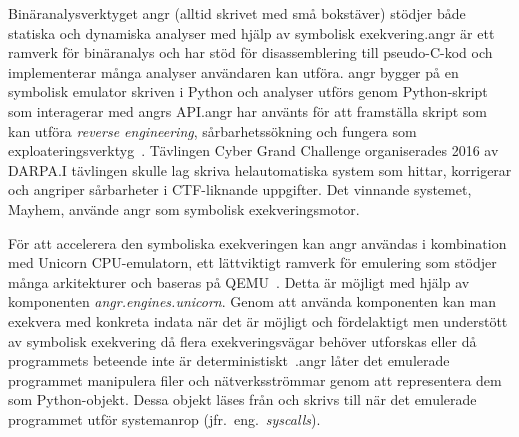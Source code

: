 Binäranalysverktyget angr (alltid skrivet med små bokstäver) stödjer både
statiska och dynamiska analyser med hjälp av symbolisk exekvering.\@ angr är ett
ramverk för binäranalys och har stöd för disassemblering till pseudo-C-kod och
implementerar många analyser användaren kan utföra. angr bygger på en symbolisk
emulator skriven i Python och analyser utförs genom Python-skript som
interagerar med angrs API.\@ angr har använts för att framställa skript som kan
utföra \emph{reverse engineering}, sårbarhetssökning och fungera som
exploateringsverktyg~\cite{angr_docs}.  Tävlingen Cyber Grand Challenge
organiserades 2016 av DARPA.\@ I tävlingen skulle lag skriva helautomatiska system
som hittar, korrigerar och angriper sårbarheter i CTF-liknande uppgifter. Det
vinnande systemet, Mayhem, använde angr som symbolisk exekveringsmotor.

För att accelerera den symboliska exekveringen kan angr användas i kombination
med Unicorn CPU-emulatorn, ett lättviktigt ramverk för emulering som stödjer
många arkitekturer och baseras på QEMU~\cite{UnicornEngine}. Detta är möjligt
med hjälp av komponenten \emph{angr.engines.unicorn}. Genom att använda
komponenten kan man exekvera med konkreta indata när det är möjligt och
fördelaktigt men understött av symbolisk exekvering då flera exekveringsvägar
behöver utforskas eller då programmets beteende inte är
deterministiskt~\cite{angrUnicornEngine}.\@ angr låter det emulerade programmet
manipulera filer och nätverksströmmar genom att representera dem som
Python-objekt. Dessa objekt läses från och skrivs till när det emulerade
programmet utför systemanrop (jfr.\ eng.\ \emph{syscalls}).
